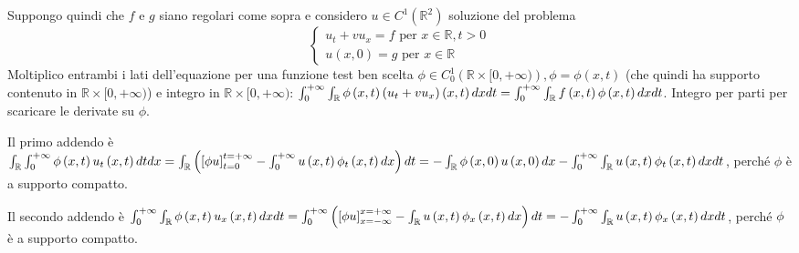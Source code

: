 \documentclass{article}
\begin{document}
Suppongo quindi che $f$ e $g$ siano regolari come sopra e considero $u\in
C^{1}\left( 
\mathbb{R}
^{2}\right) $ soluzione del problema 
\begin{equation*}
\left\{ 
\begin{array}{c}
u_{t}+vu_{x}=f\text{ per }x\in 
\mathbb{R}
,t>0 \\ 
u\left( x,0\right) =g\text{ per }x\in 
\mathbb{R}%
\end{array}%
\right. 
\end{equation*}
Moltiplico entrambi i lati dell'equazione per una funzione test
ben scelta $\phi \in C_{0}^{1}\left( 
\mathbb{R}
\times \lbrack 0,+\infty )\right) ,\phi =\phi \left( x,t\right) $ (che
quindi ha supporto contenuto in $%
\mathbb{R}
\times \lbrack 0,+\infty )$) e integro in $%
\mathbb{R}
\times \lbrack 0,+\infty )$: $\int_{0}^{+\infty }\int_{%
\mathbb{R}
}\phi \left( x,t\right) \left( u_{t}+vu_{x}\right) \left( x,t\right)
dxdt=\int_{0}^{+\infty }\int_{%
\mathbb{R}
}f\left( x,t\right) \phi \left( x,t\right) dxdt$. Integro per parti per
scaricare le derivate su $\phi $.

Il primo addendo \`{e} $\int_{%
\mathbb{R}
}\int_{0}^{+\infty }\phi \left( x,t\right) u_{t}\left( x,t\right) dtdx=\int_{%
\mathbb{R}
}\left( \left[ \phi u\right] _{t=0}^{t=+\infty }-\int_{0}^{+\infty }u\left(
x,t\right) \phi _{t}\left( x,t\right) dx\right) dt=-\int_{%
\mathbb{R}
}\phi \left( x,0\right) u\left( x,0\right) dx-\int_{0}^{+\infty }\int_{%
\mathbb{R}
}u\left( x,t\right) \phi _{t}\left( x,t\right) dxdt$, perch\'{e} $\phi $ 
\`{e} a supporto compatto.

Il secondo addendo \`{e} $\int_{0}^{+\infty }\int_{%
\mathbb{R}
}\phi \left( x,t\right) u_{x}\left( x,t\right) dxdt=\int_{0}^{+\infty
}\left( \left[ \phi u\right] _{x=-\infty }^{x=+\infty }-\int_{%
\mathbb{R}
}u\left( x,t\right) \phi _{x}\left( x,t\right) dx\right)
dt=-\int_{0}^{+\infty }\int_{%
\mathbb{R}
}u\left( x,t\right) \phi _{x}\left( x,t\right) dxdt$, perch\'{e} $\phi $ 
\`{e} a supporto compatto.
\end{document}
